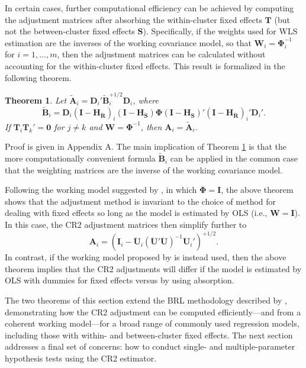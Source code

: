 \documentclass[12pt]{article}\usepackage[]{graphicx}\usepackage[]{color}
\newtheorem{thm}{Theorem}
\newcommand{\bm}{\mathbf}
\newcommand{\bs}{\boldsymbol}
\begin{document}
In certain cases, further computational efficiency can be achieved by computing the adjustment matrices after absorbing the within-cluster fixed effects $\bm{T}$ (but not the between-cluster fixed effects $\bm{S}$). 
Specifically, if the weights used for WLS estimation are the inverses of the working covariance model, so that $\bm{W}_i = \bs\Phi_i^{-1}$ for $i = 1,...,m$, then the adjustment matrices can be calculated without accounting for the within-cluster fixed effects. 
This result is formalized in the following theorem.  

\begin{thm}
\label{thm:absorb}
Let $\bm{\tilde{A}}_i = \bm{D}_i'\bm{\tilde{B}}_i^{+1/2} \bm{D}_i$, where 
\begin{equation}
\label{eq:CR2_B_tilde}
\bm{\tilde{B}}_i = \bm{D}_i\left(\bm{I} - \bm{H_{\ddot{R}}}\right)_i \left(\bm{I} - \bm{H_{\ddot{S}}}\right) \bs\Phi \left(\bm{I} - \bm{H_{\ddot{S}}}\right)' \left(\bm{I} - \bm{H_{\ddot{R}}}\right)_i' \bm{D}_i'.
\end{equation}
If $\bm{T}_i \bm{T}_k' = \bm{0}$ for $j \neq k$ and $\bm{W} = \bs\Phi^{-1}$, then $\bm{A}_i = \bm{\tilde{A}}_i$. 
\end{thm}

Proof is given in Appendix A.
The main implication of Theorem \ref{thm:absorb} is that the more computationally convenient formula $\bm{\tilde{B}}_i$ can be applied in the common case that the weighting matrices are the inverse of the working covariance model.

Following the working model suggested by \citet{Bell2002bias}, in which $\bs\Phi = \bm{I}$, the above theorem shows that the adjustment method is invariant to the choice of method for dealing with fixed effects so long as the model is estimated by OLS (i.e., $\bm{W} = \bm{I}$).
In this case, the CR2 adjustment matrices then simplify further to \[
\bm{A}_i = \left(\bm{I}_i - \bm{\ddot{U}}_i\left(\bm{\ddot{U}}'\bm{\ddot{U}}\right)^{-1}\bm{\ddot{U}}_i'\right)^{+1/2}. \]
In contrast, if the working model proposed by \citet{Imbens2015robust} is instead used, then the above theorem implies that the CR2 adjustments will differ if the model is estimated by OLS with dummies for fixed effects versus by using absorption.

The two theorems of this section extend the BRL methodology described by \citet{Bell2002bias}, demonstrating how the CR2 adjustment can be computed efficiently---and from a coherent working model---for a broad range of commonly used regression models, including those with within- and between-cluster fixed effects.
The next section addresses a final set of concerns: how to conduct single- and multiple-parameter hypothesis tests using the CR2 estimator. 
\end{document}
